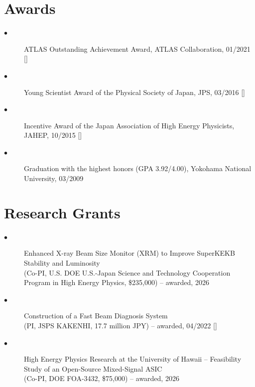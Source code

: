 \documentclass[11pt]{article}
\begin{document}
\section*{\large{Awards}} 

{\footnotesize
\begin{description}
\item[$\bullet$]{ATLAS Outstanding Achievement Award, ATLAS Collaboration, 01/2021
[]}
\item[$\bullet$]{Young Scientist Award of the Physical Society of Japan, JPS, 03/2016
[]}
\item[$\bullet$]{Incentive Award of the Japan Association of High Energy Physicists, JAHEP, 10/2015
[]}
\item[$\bullet$]{Graduation with the highest honors (GPA 3.92/4.00), Yokohama National University, 03/2009}
\end{description}
}

\section*{\large{Research Grants}} 
{\footnotesize
\begin{description}
\item[$\bullet$]{Enhanced X-ray Beam Size Monitor (XRM) to Improve SuperKEKB Stability and Luminosity \\
\hspace{-0.25in} (Co-PI, U.S. DOE U.S.-Japan Science and Technology Cooperation Program in High Energy Physics, \$235,000) -- awarded, 2026}
\item[$\bullet$]{Construction of a Fast Beam Diagnosis System \\
\hspace{-0.25in} (PI, JSPS KAKENHI, 17.7 million JPY) -- awarded, 04/2022 []} \\
\item[$\bullet$]{High Energy Physics Research at the University of Hawaii -- Feasibility Study of an Open-Source Mixed-Signal ASIC \\
\hspace{-0.25in} (Co-PI, DOE FOA-3432, \$75,000) -- awarded, 2026}
\end{description}
}
\end{document}

